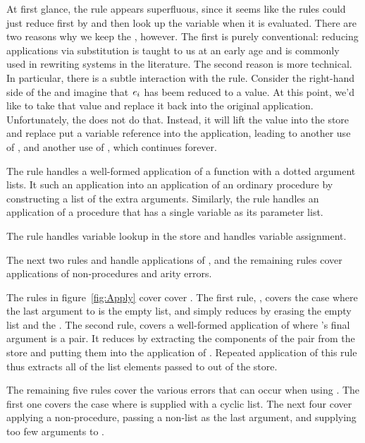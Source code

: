 At first glance, the rule  appears superfluous, since it seems like the rules could just reduce first by  and then look up the variable when it is evaluated. 
There are two reasons why we keep the , however. 
The first is purely conventional: reducing applications via substitution is taught to us at an early age and is commonly used in rewriting systems in the literature.
The second reason is more technical. In particular, there is a subtle interaction with the  rule. 
Consider the right-hand side of the  and imagine that $\textnormal{\textit{e}}_i$ has beem reduced to a value. At this point, we'd like to take that value and replace it back into the original application. Unfortunately, the  does not do that. 
Instead, it will lift the value into the store and replace put a variable reference into the application, leading to another use of , and another use of , which continues forever.

The rule  handles a well-formed application of a function with a dotted argument lists. 
It such an application into an application of an
ordinary procedure by constructing a list of the extra arguments. Similarly, the rule  handles an application of a procedure that has a single variable as its parameter list.

The rule  handles variable lookup in the store and  handles variable assignment.

The next two rules  and  handle applications of , and the remaining rules cover applications of non-procedures and arity errors.

The rules in figure~\ref{fig:Apply} cover 
cover . 
The first rule, , covers the case where the last argument to
 is the empty list, and simply reduces by erasing the
empty list and the . The second rule, 
covers a well-formed application of  where 's final argument is a pair. It
reduces by extracting the components of the pair from the store and
putting them into the application of . Repeated
application of this rule thus extracts all of the list elements passed
to  out of the store. 

The remaining five rules cover the
various errors that can occur when using . The first one covers the case where  is supplied with a cyclic list. The next four cover applying a
non-procedure, passing a non-list as the last argument, and supplying
too few arguments to .

